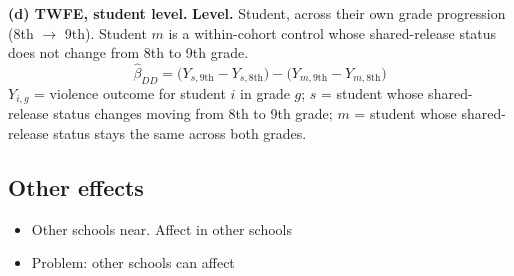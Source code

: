 \medskip
\noindent\textbf{(d) TWFE, student level.}
\noindent\textbf{Level.} Student, across their own grade progression (8th
$\to$ 9th). Student $m$ is a within-cohort control whose shared-release
status does not change from 8th to 9th grade.
\begin{equation}
  \hat\beta_{DD} = \big(Y_{s,\text{9th}} - Y_{s,\text{8th}}\big)
  - \big(Y_{m,\text{9th}} - Y_{m,\text{8th}}\big)
\end{equation}
$Y_{i,g}$ = violence outcome for student $i$ in grade $g$; $s$ = student
whose shared-release status changes moving from 8th to 9th grade; $m$ =
student whose shared-release status stays the same across both grades.



\subsection{Other effects}

\begin{itemize}
\item Other schools near. Affect in other schools
\item Problem: other schools can affect
\end{itemize}


